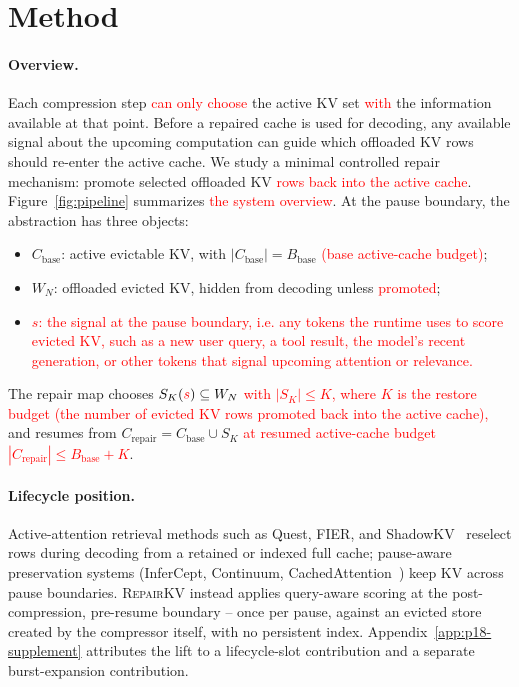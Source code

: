 \documentclass{article}
\newcommand{\repairkv}{\textsc{RepairKV}}
\newcommand{\bbase}{\ensuremath{B_{\mathrm{base}}}}
\begin{document}
\section{Method}
\label{sec:method}

\paragraph{Overview.}
Each compression step \textcolor{red}{can only choose} the active KV set
\textcolor{red}{with} the information available at that point.
Before a repaired cache is used for decoding, any available signal about the
upcoming computation can guide which offloaded KV rows should re-enter the
active cache.
We study a minimal controlled repair mechanism: promote selected offloaded
KV \textcolor{red}{rows back into the active cache}.
Figure~\ref{fig:pipeline} summarizes \textcolor{red}{the system overview}.
At the pause boundary, the abstraction has three objects:
\begin{itemize}[leftmargin=1.4em,noitemsep,topsep=2pt]
  \item $C_{\mathrm{base}}$: active evictable KV, with
  $|C_{\mathrm{base}}|=\bbase$ \textcolor{red}{(base active-cache budget)};
  \item $W_N$: offloaded evicted KV, hidden from decoding unless \textcolor{red}{promoted}; 
  \item \textcolor{red}{$s$: the signal at the pause boundary, i.e. any
  tokens the runtime uses to score evicted KV, such as a new user
  query, a tool result, the model's recent generation, or other tokens
  that signal upcoming attention or relevance.}
\end{itemize}
The repair map chooses $S_K(\textcolor{red}{s})\subseteq W_N$ \textcolor{red}{with
$|S_K|\le K$, where $K$ is the restore budget (the number of evicted KV
rows promoted back into the active cache),} and resumes from
$C_{\mathrm{repair}}=C_{\mathrm{base}}\cup S_K$ \textcolor{red}{at resumed
active-cache budget $|C_{\mathrm{repair}}|\le \bbase+K$}.

\paragraph{\textcolor{green!50!black}{Lifecycle position.}}
\textcolor{green!50!black}{Active-attention retrieval methods such as Quest, FIER, and ShadowKV~\citep{quest,fier,shadowkv} reselect rows during decoding from a retained or indexed full cache; pause-aware preservation systems (InferCept, Continuum, CachedAttention~\citep{infercept,continuum,cachedattention}) keep KV across pause boundaries. \repairkv{} instead applies query-aware scoring at the post-compression, pre-resume boundary -- once per pause, against an evicted store created by the compressor itself, with no persistent index. Appendix~\ref{app:p18-supplement} attributes the lift to a lifecycle-slot contribution and a separate burst-expansion contribution.}
\end{document}
